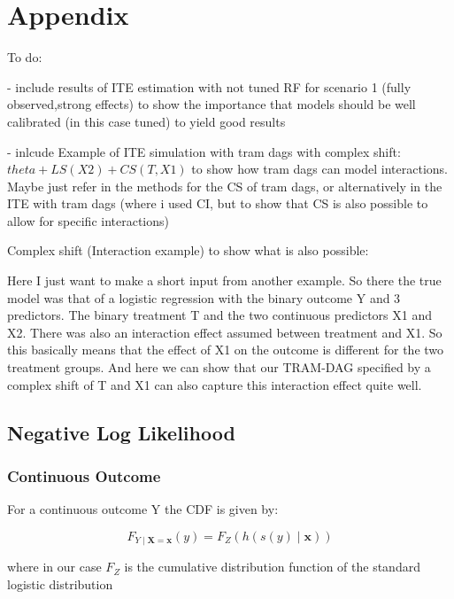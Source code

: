 



\chapter{Appendix}


To do:

- include results of ITE estimation with not tuned RF for scenario 1 (fully observed,strong effects) to show the importance that models should be well calibrated (in this case tuned) to yield good results

- inlcude Example of ITE simulation with tram dags with complex shift: $theta + LS(X2) + CS(T, X1)$ to show how tram dags can model interactions. Maybe just refer in the methods for the CS of tram dags, or alternatively in the ITE with tram dags (where i used CI, but to show that CS is also possible to allow for specific interactions)

Complex shift (Interaction example) to show what is also possible:

Here I just want to make a short input from another example. So there the true model was that of a logistic regression with the binary outcome Y and 3 predictors. The binary treatment T and the two continuous predictors X1 and X2. There was also an interaction effect assumed between treatment and X1. So this basically means that the effect of X1 on the outcome is different for the two treatment groups.
And here we can show that our TRAM-DAG specified by a complex shift of T and X1 can also capture this interaction effect quite well.


\section{Negative Log Likelihood}


\subsection{Continuous Outcome}

For a continuous outcome Y the CDF is given by:

\begin{equation}
F_{Y \mid \mathbf{X} = \mathbf{x}}(y) = F_Z(h(s(y) \mid \mathbf{x}))
\end{equation}

where in our case \( F_Z \) is the cumulative distribution function of the standard logistic distribution

